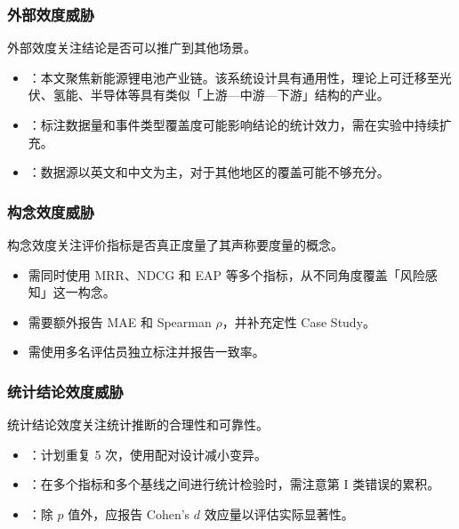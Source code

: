 \subsubsection{外部效度威胁}

外部效度关注结论是否可以推广到其他场景。

\begin{itemize}
    \item {}：本文聚焦新能源锂电池产业链。该系统设计具有通用性，理论上可迁移至光伏、氢能、半导体等具有类似「上游—中游—下游」结构的产业。
    \item {}：标注数据量和事件类型覆盖度可能影响结论的统计效力，需在实验中持续扩充。
    \item {}：数据源以英文和中文为主，对于其他地区的覆盖可能不够充分。
\end{itemize}

\subsubsection{构念效度威胁}

构念效度关注评价指标是否真正度量了其声称要度量的概念。

\begin{itemize}
    \item {}需同时使用 MRR、NDCG 和 EAP 等多个指标，从不同角度覆盖「风险感知」这一构念。
    \item {}需要额外报告 MAE 和 Spearman $\rho$，并补充定性 Case Study。
    \item {}需使用多名评估员独立标注并报告一致率。
\end{itemize}

\subsubsection{统计结论效度威胁}

统计结论效度关注统计推断的合理性和可靠性。

\begin{itemize}
    \item {}：计划重复 5 次，使用配对设计减小变异。
    \item {}：在多个指标和多个基线之间进行统计检验时，需注意第 I 类错误的累积。
    \item {}：除 $p$ 值外，应报告 Cohen's $d$ 效应量以评估实际显著性。
\end{itemize}
